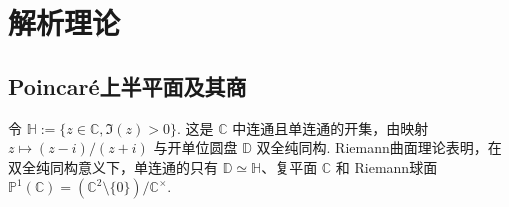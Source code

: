 \chapter{解析理论}\label{chap:modular-1}
\section{Poincaré上半平面及其商}\label{sec:modular-1-1}
令 $\mathbb H:=\{z\in\mathbb C,\Im(z)>0\}$. 这是 $\mathbb C$ 中连通且单连通的开集，由映射 $z\mapsto (z-i)/(z+i)$ 与开单位圆盘 $\mathbb D$ 双全纯同构. Riemann曲面理论表明，在双全纯同构意义下，单连通的只有 $\mathbb D\simeq\mathbb H$、复平面 $\mathbb C$ 和 Riemann球面 $\mathbb P^1(\mathbb C)=(\mathbb C^2\setminus\{0\})/\mathbb C^\times$.

